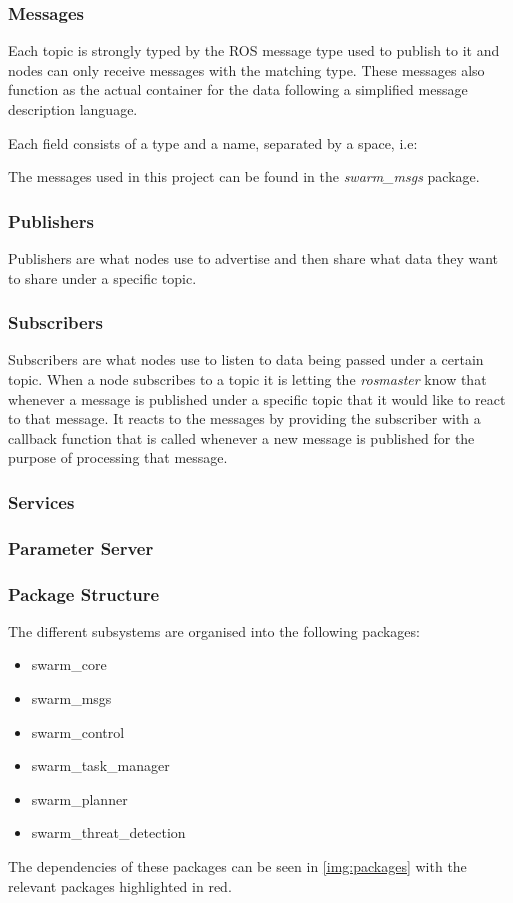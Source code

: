 \documentclass[bsc,frontabs,twoside,singlespacing,parskip,deptreport]{infthesis}     %
\begin{document}
\subsubsection{Messages}
\label{def:sub}
Each topic is strongly typed by the ROS message type used to publish to it and nodes can only receive messages with the matching type. These messages also function as the actual container for the data following a simplified message description language.

Each field consists of a type and a name, separated by a space, i.e:

The messages used in this project can be found in the \emph{swarm\_msgs} package.

\subsubsection{Publishers}
\label{def:pub}
Publishers are what nodes use to advertise and then share what data they want to share under a specific topic.

\subsubsection{Subscribers}
Subscribers are what nodes use to listen to data being passed under a certain topic. When a node subscribes to a topic it is letting the \emph{rosmaster} know that whenever a message is published under a specific topic that it would like to react to that message. It reacts to the messages by providing the subscriber with a callback function that is called whenever a new message is published for the purpose of processing that message.

\subsubsection{Services}

\subsubsection{Parameter Server}


\subsubsection{Package Structure}
The different subsystems are organised into the following packages:
\begin{itemize}
	\item swarm\_core
	\item swarm\_msgs
	\item swarm\_control
	\item swarm\_task\_manager
	\item swarm\_planner
	\item swarm\_threat\_detection
\end{itemize}
The dependencies of these packages can be seen in \ref{img:packages} with the relevant packages highlighted in red.
\end{document}
